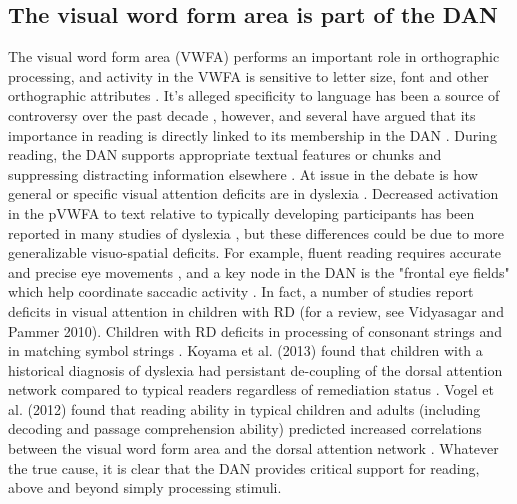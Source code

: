 \subsection{The visual word form area is part of the DAN} 
The visual word form area (VWFA) performs an important role in orthographic processing, and activity in the VWFA is sensitive to letter size, font and other orthographic attributes \citep{References from Vogel2011}. It's alleged specificity to language has been a source of controversy over the past decade \citep{...}, however, and several have argued that its importance in reading is directly linked to its membership in the DAN \citep{Vogel2014}. During reading, the DAN supports appropriate textual features or chunks and suppressing distracting information elsewhere \citep{Corbetta2002}. At issue in the debate is how general or specific visual attention deficits are in dyslexia \citep{Vogel2011}. Decreased activation in the pVWFA to text relative to typically developing participants has been reported in many studies of dyslexia \citep{...}, but these differences could be due to more generalizable visuo-spatial deficits. For example, fluent reading requires accurate and precise eye movements \citep{Rayner1998}, and a key node in the DAN is the "frontal eye fields" which help coordinate saccadic activity \citep{Petit1997,Connolly2000}. In fact, a number of studies report deficits in visual attention in children with RD (for a review, see Vidyasagar and Pammer 2010). Children with RD deficits in processing of consonant strings \citep{Pammer2004} and in matching symbol strings \citep{LassusSangosse2008}. Koyama et al. (2013) found that children with a historical diagnosis of dyslexia had persistant de-coupling of the dorsal attention network compared to typical readers regardless of remediation status \citep{Koyama2013}. Vogel et al. (2012) found that reading ability in typical children and adults (including decoding and passage comprehension ability) predicted increased correlations between the visual word form area and the dorsal attention network \citep{Vogel2012}. Whatever the true cause, it is clear that the DAN provides critical support for reading, above and beyond simply processing stimuli.

